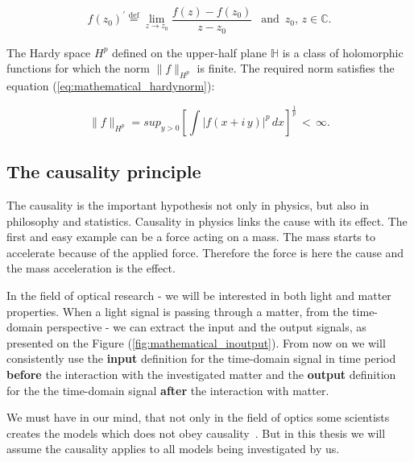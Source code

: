 \documentclass[12pt,twoside,a4paper]{article}
\numberwithin{equation}{subsection}
\numberwithin{figure}{subsection}
\begin{document}
\begin{equation} \label{eq:mathematical_complexderivative}
  f(z_0)^{'} \stackrel{\mathrm{def}}{=} \lim_{z \to z_0} \frac{f(z) - f(z_0)}{z - z_0} \; \, \text{ and } \, z_0, \, z \in \mathbb{C} .
\end{equation}

The Hardy space $ H^{p} $ defined on the upper-half plane $ \mathbb{H} $ is a class of holomorphic functions for which the norm $
\|f\|_{H^p} $ is finite. The required norm satisfies the equation (\ref{eq:mathematical_hardynorm}):

\begin{equation} \label{eq:mathematical_hardynorm}
  \|f\|_{H^p} = sup_{ y > 0 } \left[ \int |f(x + i \, y)|^{p} \, dx \right]^{\frac{1}{p}} \, < \, \infty.
\end{equation}

\subsection{The causality principle} \label{chap:mathematical_causality}

The causality is the important hypothesis not only in physics, but also in philosophy and statistics. Causality in physics links the cause
with its effect. The first and easy example can be a force acting on a mass. The mass starts to accelerate because of the applied force.
Therefore the force is here the cause and the mass acceleration is the effect.

In the field of optical research - we will be interested in both light and matter properties. When a light signal is passing through a
matter, from the time-domain perspective - we can extract the input and the output signals, as presented on the Figure
(\ref{fig:mathematical_inoutput}). From now on we will consistently use the \textbf{input} definition for the time-domain signal in time
period \textbf{before} the interaction with the investigated matter and the \textbf{output} definition for the the time-domain signal
\textbf{after} the interaction with matter.

 We must have in our mind, that not only in the field of optics some scientists creates the models which does not obey
 causality~\cite{mukamel_causal}. But in this thesis we will assume the causality applies to all models being investigated by us.
\end{document}

